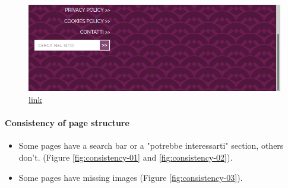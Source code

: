 \documentclass[a4paper, 11pt, parskip=half, headsepline]{scrreprt}
\begin{document}
\begin{figure}[H]
	\centering
	\begin{minipage}[t]{0.5\textwidth}
		\centering
		\includegraphics[width=1\linewidth, keepaspectratio]{91-spatial-allocation-searchbar}
		\caption{\href{https://www.visitmonterosa.com/}{link}}
		\label{fig:spatial-allocation-01}
	\end{minipage} 
\end{figure}


\paragraph{Consistency of page structure}
\begin{itemize}
	\item Some pages have a search bar or a "potrebbe interessarti" section, others don't. (Figure \ref{fig:consistency-01} and \ref{fig:consistency-02}).
    \item Some pages have missing images (Figure \ref{fig:consistency-03}).
\end{itemize}
\end{document}
